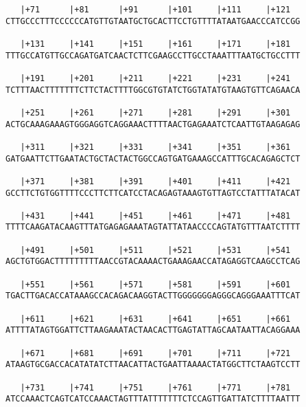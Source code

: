 \documentclass{article}
\begin{document}
\begin{Verbatim}
   |+71      |+81      |+91      |+101     |+111     |+121  
CTTGCCCTTTCCCCCCATGTTGTAATGCTGCACTTCCTGTTTTATAATGAACCCATCCGG
                                                            
   |+131     |+141     |+151     |+161     |+171     |+181  
TTTGCCATGTTGCCAGATGATCAACTCTTCGAAGCCTTGCCTAAATTTAATGCTGCCTTT
                                                            
   |+191     |+201     |+211     |+221     |+231     |+241  
TCTTTAACTTTTTTTCTTCTACTTTTGGCGTGTATCTGGTATATGTAAGTGTTCAGAACA
                                                            
   |+251     |+261     |+271     |+281     |+291     |+301  
ACTGCAAAGAAAGTGGGAGGTCAGGAAACTTTTAACTGAGAAATCTCAATTGTAAGAGAG
                                                            
   |+311     |+321     |+331     |+341     |+351     |+361  
GATGAATTCTTGAATACTGCTACTACTGGCCAGTGATGAAAGCCATTTGCACAGAGCTCT
                                                            
   |+371     |+381     |+391     |+401     |+411     |+421  
GCCTTCTGTGGTTTTCCCTTCTTCATCCTACAGAGTAAAGTGTTAGTCCTATTTATACAT
                                                            
   |+431     |+441     |+451     |+461     |+471     |+481  
TTTTCAAGATACAAGTTTATGAGAGAAATAGTATTATAACCCCAGTATGTTTAATCTTTT
                                                            
   |+491     |+501     |+511     |+521     |+531     |+541  
AGCTGTGGACTTTTTTTTTAACCGTACAAAACTGAAAGAACCATAGAGGTCAAGCCTCAG
                                                            
   |+551     |+561     |+571     |+581     |+591     |+601  
TGACTTGACACCATAAAGCCACAGACAAGGTACTTGGGGGGGAGGGCAGGGAAATTTCAT
                                                            
   |+611     |+621     |+631     |+641     |+651     |+661  
ATTTTATAGTGGATTCTTAAGAAATACTAACACTTGAGTATTAGCAATAATTACAGGAAA
                                                            
   |+671     |+681     |+691     |+701     |+711     |+721  
ATAAGTGCGACCACATATATCTTAACATTACTGAATTAAAACTATGGCTTCTAAGTCCTT
                                                            
   |+731     |+741     |+751     |+761     |+771     |+781  
ATCCAAACTCAGTCATCCAAACTAGTTTATTTTTTTCTCCAGTTGATTATCTTTTAATTT
                                                            

\end{Verbatim}
\end{document}
